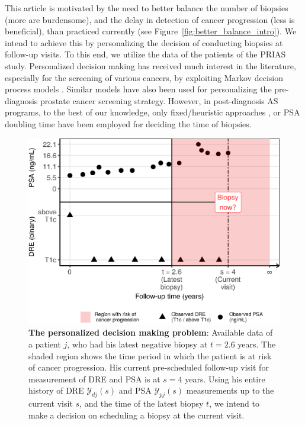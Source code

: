 This article is motivated by the need to better balance the number of biopsies (more are burdensome), and the delay in detection of cancer progression (less is beneficial), than practiced currently (see Figure~\ref{fig:better_balance_intro}). We intend to achieve this by personalizing the decision of conducting biopsies at follow-up visits. To this end, we utilize the data of the patients of the PRIAS study. Personalized decision making has received much interest in the literature, especially for the screening of various cancers, by exploiting Markov decision process models \cite{ayer2012or, akhavan2017markov,erenay2014optimizing}. Similar models have also been used for personalizing the pre-diagnosis prostate cancer screening strategy\cite{zhang2012optimization,krahn1994screening}. However, in post-diagnosis AS programs, to the best of our knowledge, only fixed/heuristic approaches \cite{inoue2018comparative,carvalho}, or PSA doubling time \cite{bokhorst2015compliance} have been employed for deciding the time of biopsies.

\begin{figure}[!htb]
\captionsetup{justification=justified}
\centerline{\includegraphics[width=\columnwidth]{images/obsDataPlot_2340.eps}}
\caption{\textbf{The personalized decision making problem}: Available data of a patient $j$, who had his latest negative biopsy at $t=2.6$ years. The shaded region shows the time period in which the patient is at risk of cancer progression. His current pre-scheduled follow-up visit for measurement of DRE and PSA is at $s=4$ years. Using his entire history of DRE $\mathcal{Y}_{dj}(s)$ and PSA $\mathcal{Y}_{pj}(s)$ measurements up to the current visit $s$, and the time of the latest biopsy $t$, we intend to make a decision on scheduling a biopsy at the current visit.}
\label{fig:obsDataPlot_2340}
\end{figure}

